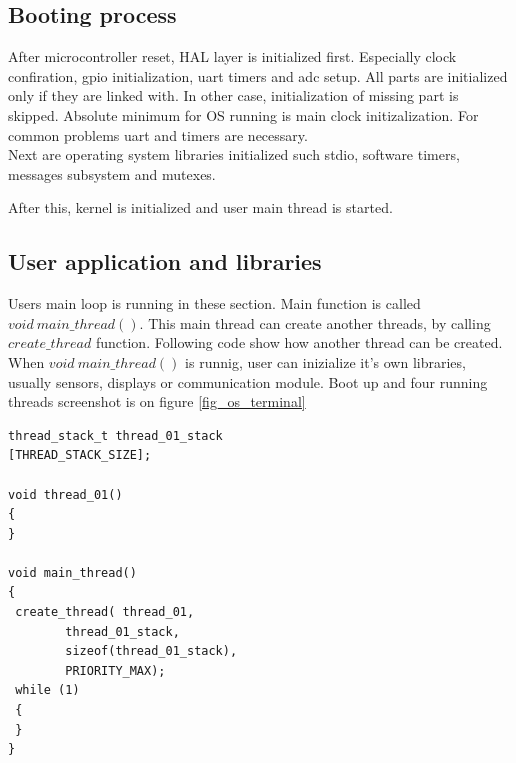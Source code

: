\documentclass[conference]{IEEEtran}
\begin{document}
\subsection{Booting process}

After microcontroller reset, HAL layer is initialized first. Especially clock confiration, gpio initialization, uart timers and adc setup.
All parts are initialized only if they are linked with. In other case, initialization of missing part is skipped.
Absolute minimum for OS running is main clock initizalization. For common problems uart and timers are necessary.\\
Next are operating system libraries initialized such stdio, software timers, messages subsystem and mutexes.

After this, kernel is initialized and user main thread is started.

\subsection{User application and libraries}

Users main loop is running in these section. Main function is called $void\ main\_thread()$. This main thread can create another threads, by calling $create\_thread$ function. Following code show how another thread can be created. When $void\ main\_thread()$ is runnig, user can inizialize it's own libraries, usually sensors, displays or communication module. Boot up and four running threads screenshot is on figure \ref{fig_os_terminal}

\noindent\begin{minipage}{.45\textwidth}
\lstset{language=C++}    
\begin{lstlisting}[frame=single, caption = thread creating]
thread_stack_t thread_01_stack
[THREAD_STACK_SIZE];

void thread_01()
{
}

void main_thread()
{
 create_thread(	thread_01, 
		thread_01_stack, 
		sizeof(thread_01_stack), 
		PRIORITY_MAX);
 while (1)
 {
 }
}
\end{lstlisting}
\end{minipage}\hfill
\end{document}
